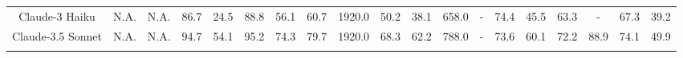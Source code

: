 \begin{table*}[ht]
{\begin{tabular}{ccc|cccccccccccccccc}
        Claude-3 Haiku & \hspace{-0.9em}N.A. & \hspace{-0.9em}N.A. & \hspace{-0.5em}86.7 & \hspace{-0.9em}24.5 & \hspace{-0.9em}88.8 & \hspace{-0.9em}56.1 & \hspace{-0.9em}60.7 & \hspace{-0.9em}1920.0 & \hspace{-0.9em}50.2 & \hspace{-0.9em}38.1 & \hspace{-0.9em}658.0 & \hspace{-0.9em}- & \hspace{-0.9em}74.4 & \hspace{-0.9em}45.5 & \hspace{-0.9em}63.3 & \hspace{-0.9em}- & \hspace{-0.9em}67.3 & \hspace{-0.9em}39.2 \\ 
        \rowcolor{tablegray}
        Claude-3.5 Sonnet & \hspace{-0.9em}N.A. & \hspace{-0.9em}N.A. & \hspace{-0.5em}94.7 & \hspace{-0.9em}54.1 & \hspace{-0.9em}95.2 & \hspace{-0.9em}74.3 & \hspace{-0.9em}79.7 & \hspace{-0.9em}1920.0 & \hspace{-0.9em}68.3 & \hspace{-0.9em}62.2 & \hspace{-0.9em}788.0 & \hspace{-0.9em}- & \hspace{-0.9em}73.6 & \hspace{-0.9em}60.1 & \hspace{-0.9em}72.2 & \hspace{-0.9em}88.9 & \hspace{-0.9em}74.1 & \hspace{-0.9em}49.9 \\ 
        \rowcolor{tablegray}

\end{tabular}}
\end{table*}
